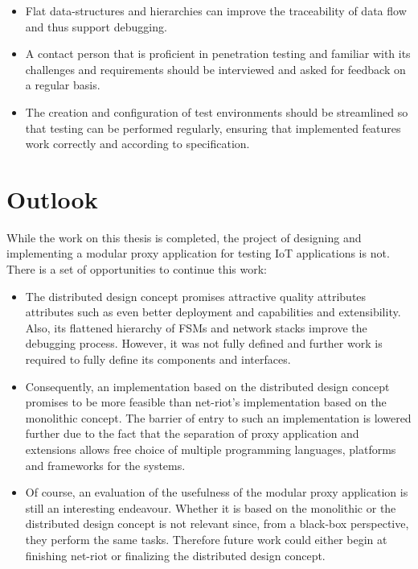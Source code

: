 \begin{itemize}
    \item Flat data-structures and hierarchies can improve the traceability of data flow and thus support debugging.
    \item A contact person that is proficient in penetration testing and familiar with its challenges and requirements should be interviewed and asked for feedback on a regular basis.
    \item The creation and configuration of test environments should be streamlined so that testing can be performed regularly, ensuring that implemented features work correctly and according to specification.
\end{itemize}

\section{Outlook}
\label{sec:outlook}
While the work on this thesis is completed, the project of designing and implementing a modular proxy application for testing \ac{IoT} applications is not. There is a set of opportunities to continue this work:
\begin{itemize}
    \item The distributed design concept promises attractive quality attributes attributes such as even better deployment and capabilities and extensibility. Also, its flattened hierarchy of \acp{FSM} and network stacks improve the debugging process. However, it was not fully defined and further work is required to fully define its components and interfaces.
    \item Consequently, an implementation based on the distributed design concept promises to be more feasible than net-riot's implementation based on the monolithic concept. The barrier of entry to such an implementation is lowered further due to the fact that the separation of proxy application and extensions allows free choice of multiple programming languages, platforms and frameworks for the systems.
    \item Of course, an evaluation of the usefulness of the modular proxy application is still an interesting endeavour. Whether it is based on the monolithic or the distributed design concept is not relevant since, from a black-box perspective, they perform the same tasks. Therefore future work could either begin at finishing net-riot or finalizing the distributed design concept.  
\end{itemize}